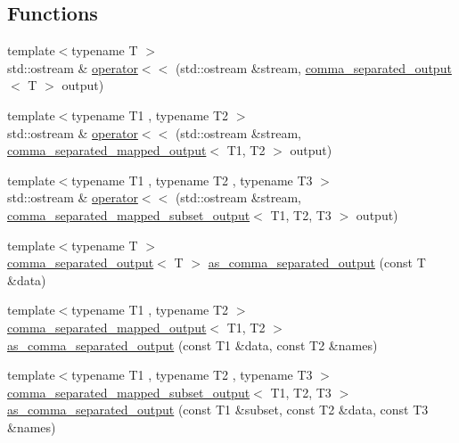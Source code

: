 \subsection*{Functions}
\begin{DoxyCompactItemize}
\item 
{\footnotesize template$<$typename T $>$ }\\std\+::ostream \& \hyperlink{namespaceterraces_1_1utils_a5e3d378a88978234fe3a4adc9bea47b9}{operator$<$$<$} (std\+::ostream \&stream, \hyperlink{structterraces_1_1utils_1_1comma__separated__output}{comma\+\_\+separated\+\_\+output}$<$ T $>$ output)
\item 
{\footnotesize template$<$typename T1 , typename T2 $>$ }\\std\+::ostream \& \hyperlink{namespaceterraces_1_1utils_a00158c640c24f8fc9ceeaf63a1660d99}{operator$<$$<$} (std\+::ostream \&stream, \hyperlink{structterraces_1_1utils_1_1comma__separated__mapped__output}{comma\+\_\+separated\+\_\+mapped\+\_\+output}$<$ T1, T2 $>$ output)
\item 
{\footnotesize template$<$typename T1 , typename T2 , typename T3 $>$ }\\std\+::ostream \& \hyperlink{namespaceterraces_1_1utils_a4f2c8fedb5f9c911ac107e32c4bdb7e1}{operator$<$$<$} (std\+::ostream \&stream, \hyperlink{structterraces_1_1utils_1_1comma__separated__mapped__subset__output}{comma\+\_\+separated\+\_\+mapped\+\_\+subset\+\_\+output}$<$ T1, T2, T3 $>$ output)
\item 
{\footnotesize template$<$typename T $>$ }\\\hyperlink{structterraces_1_1utils_1_1comma__separated__output}{comma\+\_\+separated\+\_\+output}$<$ T $>$ \hyperlink{namespaceterraces_1_1utils_a0179dbbfb1f4aa737076b3f47fdccdb4}{as\+\_\+comma\+\_\+separated\+\_\+output} (const T \&data)
\item 
{\footnotesize template$<$typename T1 , typename T2 $>$ }\\\hyperlink{structterraces_1_1utils_1_1comma__separated__mapped__output}{comma\+\_\+separated\+\_\+mapped\+\_\+output}$<$ T1, T2 $>$ \hyperlink{namespaceterraces_1_1utils_ac87c5dc23381a9d53a4ceb4f41070e40}{as\+\_\+comma\+\_\+separated\+\_\+output} (const T1 \&data, const T2 \&names)
\item 
{\footnotesize template$<$typename T1 , typename T2 , typename T3 $>$ }\\\hyperlink{structterraces_1_1utils_1_1comma__separated__mapped__subset__output}{comma\+\_\+separated\+\_\+mapped\+\_\+subset\+\_\+output}$<$ T1, T2, T3 $>$ \hyperlink{namespaceterraces_1_1utils_a1b6a6d4d742c0466921e62d127c51df9}{as\+\_\+comma\+\_\+separated\+\_\+output} (const T1 \&subset, const T2 \&data, const T3 \&names)

\end{DoxyCompactItemize}

